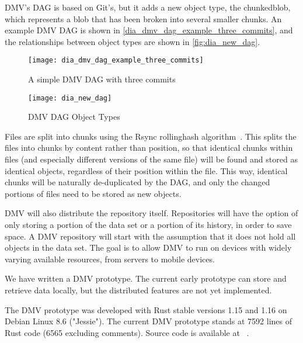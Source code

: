 %

\gls{DMV}'s \gls{DAG} is based on Git's, but it adds a new object type, the \gls{chunkedblob}, which represents a \gls{blob} that has been broken into several smaller chunks.
An example \gls{DMV} \gls{DAG} is shown in \autoref{dia_dmv_dag_example_three_commits}, and the relationships between object types are shown in \autoref{fig:dia_new_dag}.


\begin{figure}[]
    \centering

    \begin{minipage}{.65\textwidth}
        \texttt{[image: dia\_dmv\_dag\_example\_three\_commits]}
        \caption{A simple DMV DAG with three commits}
        \label{dia_dmv_dag_example_three_commits}
    \end{minipage}%
    \begin{minipage}{.35\textwidth}
        \texttt{[image: dia\_new\_dag]}
        \caption{DMV DAG Object Types}
        \label{fig:dia_new_dag}
    \end{minipage}
\end{figure}


Files are split into chunks using the Rsync \gls{rollinghash} algorithm~\cite{rsynctechreport}.
This splits the files into chunks by content rather than position, so that identical chunks within files (and especially different versions of the same file) will be found and stored as identical objects, regardless of their position within the file.
This way, identical chunks will be naturally de-duplicated by the \gls{DAG}, and only the changed portions of files need to be stored as new objects.

DMV will also distribute the repository itself.
Repositories will have the option of only storing a portion of the data set or a portion of its history, in order to save space.
A DMV repository will start with the assumption that it does not hold all objects in the data set.
The goal is to allow DMV to run on devices with widely varying available resources, from servers to mobile devices.

We have written a \gls{DMV} prototype.
The current early prototype can store and retrieve data locally, but the distributed features are not yet implemented.

The \gls{DMV} prototype was developed with Rust stable versions 1.15 and 1.16 on Debian Linux 8.6 ("Jessie").
The current DMV prototype stands at \num{7592} lines of Rust code (\num{6565} excluding comments).
Source code is available at \dmvurl~.
